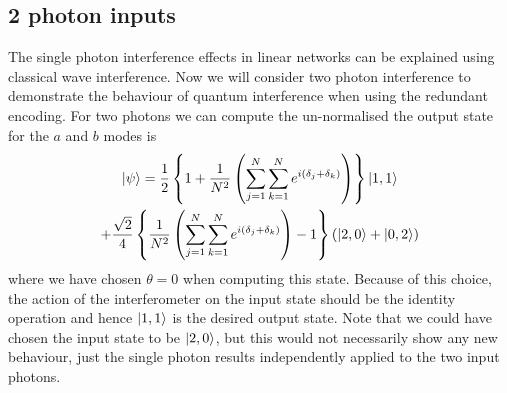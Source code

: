 \documentclass[aps,pra,twocolumn,superscriptaddress,numerical,floatfix]{revtex4-1}
\begin{document}
\subsection{2 photon inputs\label{2 photons N arbitrary}}

The single photon interference effects in linear networks can be explained using classical wave interference.  Now we will consider two photon interference to demonstrate the behaviour of quantum interference when using the redundant encoding.  For two photons we can compute the un-normalised the output state for the $a$ and $b$ modes is
\begin{multline}
	\ket{\psi} =  \frac{1}{2}\left\{ 1+\frac{1}{N^{2}}\left(\sum_{j=1}^{N}\sum_{k=1}^{N}e^{i(\delta_{j}+\delta_{k})}\right)\right\} \ket{1,1} \\
	+\frac{\sqrt{2}}{4}\left\{ \frac{1}{N^{2}}\left(\sum_{j=1}^{N}\sum_{k=1}^{N}e^{i(\delta_{j}+\delta_{k})}\right)-1\right\} \left(\ket{2,0} +\ket{0,2}\right)\label{eq:2pNarbitrary S}
\end{multline}
where we have chosen $\theta=0$ when computing this state.  Because of this choice, the action of the interferometer on the input state should be the identity operation and hence $\ket{1,1}$ is the desired output state.   Note that we could have chosen the input state to be $\ket{2,0}$, but this would not necessarily show any new behaviour, just the single photon results independently applied to the two input photons. 
\end{document}
